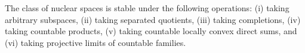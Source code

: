 The class of nuclear spaces is stable under the following operations: (i) taking arbitrary subspaces, (ii) taking separated quotients, (iii) taking completions, (iv) taking countable products, (v) taking countable locally convex direct sums, and (vi) taking projective limits of countable families.
